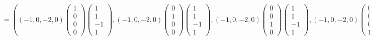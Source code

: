 \documentclass{article}
\begin{document}
$$= \left(\left(-1, 0, -2, 0\right)\begin{pmatrix}1 \\ 0 \\ 0 \\ 0\end{pmatrix}\begin{pmatrix}1 \\ 1 \\ -1 \\ 1\end{pmatrix}, \left(-1, 0, -2, 0\right)\begin{pmatrix}0 \\ 1 \\ 0 \\ 0\end{pmatrix}\begin{pmatrix}1 \\ 1 \\ -1 \\ 1\end{pmatrix}, \left(-1, 0, -2, 0\right)\begin{pmatrix}0 \\ 0 \\ 1 \\ 0\end{pmatrix}\begin{pmatrix}1 \\ 1 \\ -1 \\ 1\end{pmatrix}, \left(-1, 0, -2, 0\right)\begin{pmatrix}0 \\ 0 \\ 0 \\ 1\end{pmatrix}\begin{pmatrix}1 \\ 1 \\ -1 \\ 1\end{pmatrix}\right) =$$
\end{document}
